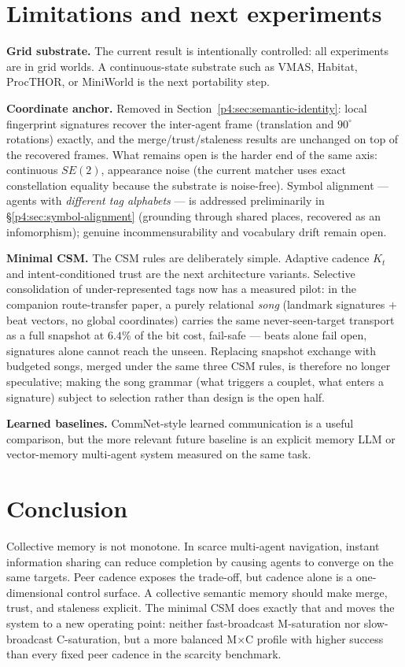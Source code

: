 \documentclass{article}
\begin{document}
\section{Limitations and next experiments}
\label{p4:sec:limitations}

\textbf{Grid substrate.} The current result is intentionally controlled:
all experiments are in grid worlds. A continuous-state substrate such
as VMAS, Habitat, ProcTHOR, or MiniWorld is the next portability step.

\textbf{Coordinate anchor.} Removed in
Section~\ref{p4:sec:semantic-identity}: local fingerprint signatures
recover the inter-agent frame (translation and $90^\circ$ rotations)
exactly, and the merge/trust/staleness results are unchanged on top of
the recovered frames. What remains open is the harder end of the same
axis: continuous $SE(2)$, appearance noise (the current matcher uses
exact constellation equality because the substrate is noise-free). Symbol
alignment --- agents with \emph{different tag alphabets} --- is addressed
preliminarily in \S\ref{p4:sec:symbol-alignment} (grounding through shared places,
recovered as an infomorphism); genuine incommensurability and vocabulary drift
remain open.

\textbf{Minimal CSM.} The CSM rules are deliberately simple. Adaptive
cadence $K_t$ and intent-conditioned trust are the next architecture
variants. Selective consolidation of under-represented tags now has a
measured pilot: in the companion route-transfer paper, a purely
relational \emph{song} (landmark signatures $+$ beat vectors, no
global coordinates) carries the same never-seen-target transport as a
full snapshot at $6.4\%$ of the bit cost, fail-safe --- beats alone
fail open, signatures alone cannot reach the unseen. Replacing
snapshot exchange with budgeted songs, merged under the same three
CSM rules, is therefore no longer speculative; making the song
grammar (what triggers a couplet, what enters a signature) subject to
selection rather than design is the open half.

\textbf{Learned baselines.} CommNet-style learned communication is a
useful comparison, but the more relevant future baseline is an explicit
memory LLM or vector-memory multi-agent system measured on the same
task.

\section{Conclusion}

Collective memory is not monotone. In scarce multi-agent navigation,
instant information sharing can reduce completion by causing agents to
converge on the same targets. Peer cadence exposes the trade-off, but
cadence alone is a one-dimensional control surface. A collective
semantic memory should make merge, trust, and staleness explicit. The
minimal CSM does exactly that and moves the system to a new operating
point: neither fast-broadcast M-saturation nor slow-broadcast
C-saturation, but a more balanced M$\times$C profile with higher
success than every fixed peer cadence in the scarcity benchmark.
\end{document}
